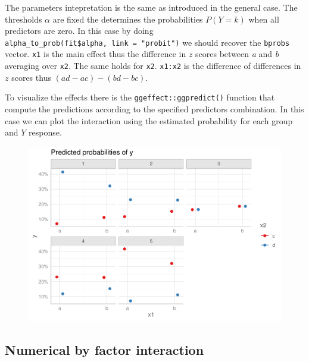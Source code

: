 \documentclass[
  man,floatsintext]{apa6}
\begin{document}
\normalsize

The parameters intepretation is the same as introduced in the general case. The thresholds \(\alpha\) are fixed the determines the probabilities \(P(Y = k)\) when all predictors are zero. In this case by doing \texttt{alpha\_to\_prob(fit\$alpha,\ link\ =\ "probit")} we should recover the \texttt{bprobs} vector. \texttt{x1} is the main effect thus the difference in \(z\) scores between \emph{a} and \emph{b} averaging over \texttt{x2}. The same holds for \texttt{x2}. \texttt{x1:x2} is the difference of differences in \(z\) scores thus \((ad - ac) - (bd - bc)\).

To visualize the effects there is the \texttt{ggeffect::ggpredict()} function that compute the predictions according to the specified predictors combination. In this case we can plot the interaction using the estimated probability for each group and \(Y\) response.

\scriptsize

\begin{figure}

{\centering \includegraphics{paper-new_files/figure-latex/unnamed-chunk-24-1} 

}

\caption{ }\label{fig:unnamed-chunk-24}
\end{figure}

\normalsize

\subsection{Numerical by factor interaction}\label{numerical-by-factor-interaction}
\end{document}
